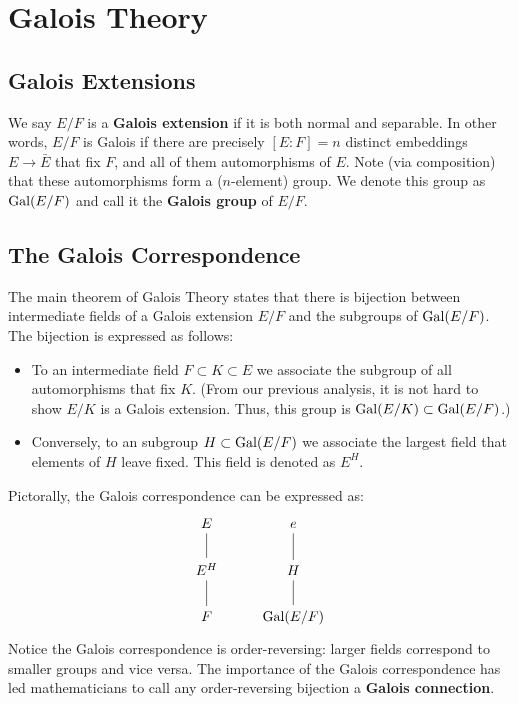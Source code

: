 \section{Galois Theory}

\subsection{Galois Extensions}

We say $E/F$ is a \textbf{Galois extension} if it is both normal and separable. In other words, $E/F$ is Galois if there are precisely $[E : F] = n$ distinct embeddings $E \to \bar{E}$ that fix $F$, and all of them automorphisms of $E$. Note (via composition) that these automorphisms form a ($n$-element) group. We denote this group as $\operatorname{Gal}(E/F)$ and call it the \textbf{Galois group} of $E/F$.

\subsection{The Galois Correspondence}

The main theorem of Galois Theory states that there is bijection between intermediate fields of a Galois extension $E/F$ and the subgroups of $\operatorname{Gal}(E/F)$. The bijection is expressed as follows:
\begin{itemize}
    \item To an intermediate field $F \subset K \subset E$ we associate the subgroup of all automorphisms that fix $K$. (From our previous analysis, it is not hard to show $E/K$ is a Galois extension. Thus, this group is $\operatorname{Gal}(E/K) \subset \operatorname{Gal}(E/F)$.)
    \item Conversely, to an subgroup $H \subset \operatorname{Gal}(E/F)$ we associate the largest field that elements of $H$ leave fixed. This field is denoted as $E^H$.
\end{itemize}

Pictorally, the Galois correspondence can be expressed as:
\[
    \begin{tikzcd}
        E \arrow[d, no head]   & e \arrow[d, no head] \\
        E^H \arrow[d, no head] & H \arrow[d, no head] \\
        F                      & \Gal(E/F)           
    \end{tikzcd}
\]
Notice the Galois correspondence is order-reversing: larger fields correspond to smaller groups and vice versa. The importance of the Galois correspondence has led mathematicians to call any order-reversing bijection a \textbf{Galois connection}.

